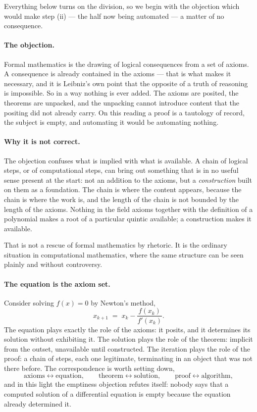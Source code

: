 \documentclass[11pt]{article}
\begin{document}
Everything below turns on the division, so we begin with the objection which would make step (ii)
--- the half now being automated --- a matter of no consequence.

\paragraph{The objection.} Formal mathematics is the drawing of logical consequences from a set of
axioms. A consequence is already contained in the axioms --- that is what makes it necessary, and it
is Leibniz's own point that the opposite of a truth of reasoning is impossible. So in a way nothing
is ever added. The axioms are posited, the theorems are unpacked, and the unpacking cannot introduce
content that the positing did not already carry. On this reading a proof is a tautology of record,
the subject is empty, and automating it would be automating nothing.

\paragraph{Why it is not correct.} The objection confuses what is implied with what is available. A
chain of logical steps, or of computational steps, can bring out something that is in no useful
sense present at the start: not an addition to the axioms, but a \emph{construction} built on them
as a foundation. The chain is where the content appears, because the chain is where the work is, and
the length of the chain is not bounded by the length of the axioms. Nothing in the field axioms
together with the definition of a polynomial makes a root of a particular quintic available; a
construction makes it available.

That is not a rescue of formal mathematics by rhetoric. It is the ordinary situation in computational
mathematics, where the same structure can be seen plainly and without controversy.

\paragraph{The equation is the axiom set.} Consider solving $f(x)=0$ by Newton's method,
\[
x_{k+1} \;=\; x_k - \frac{f(x_k)}{f'(x_k)} .
\]
The equation plays exactly the role of the axioms: it posits, and it determines its solution without
exhibiting it. The solution plays the role of the theorem: implicit from the outset, unavailable
until constructed. The iteration plays the role of the proof: a chain of steps, each one legitimate,
terminating in an object that was not there before. The correspondence is worth setting down,
\[
\text{axioms} \longleftrightarrow \text{equation},\qquad
\text{theorem} \longleftrightarrow \text{solution},\qquad
\text{proof} \longleftrightarrow \text{algorithm},
\]
and in this light the emptiness objection refutes itself: nobody says that a computed solution of a
differential equation is empty because the equation already determined it.
\end{document}

